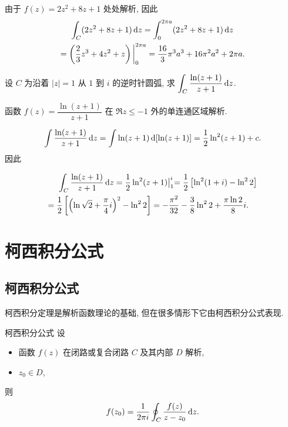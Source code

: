 \begin{solution}
	由于 $f(z)=2z^2+8z+1$ 处处解析,
	{因此
		\begin{align*}
		&\peq\int_C(2z^2+8z+1)\diff z=\int_0^{2\pi a}(2z^2+8z+1)\diff z\\
		&{=\left(\frac23z^3+4z^2+z\right)\bigg|_0^{2\pi a}=\frac{16}3\pi^3a^3+16\pi^2a^2+2\pi a.}
		\end{align*}}
\end{solution}

\begin{example}
	设 $C$ 为沿着 $|z|=1$ 从 $1$ 到 $i$ 的逆时针圆弧, 求 $\displaystyle\int_C\frac{\ln(z+1)}{z+1}\,\mathrm{d} z$.
\end{example}

\begin{solution}
	函数 $f(z)=\dfrac{\ln(z+1)}{z+1}$ 在 $\Re z\le -1$ 外的单连通区域解析.

	{
		\[\int\frac{\ln(z+1)}{z+1}\,\mathrm{d} z
		=\int\ln(z+1)\,\mathrm{d}[\ln(z+1)]=\frac{1}{2}\ln^2(z+1)+c.\]因此

		\begin{align*}
		&\peq\int_C\frac{\ln(z+1)}{z+1}\diff z=\half\ln^2(z+1)\big|_1^i
		{=\half\left[\ln^2(1+i)-\ln^22\right]}\\
		&{=\half\left[\left(\ln\sqrt2+\frac\pi4i\right)^2-\ln^22\right]
		=-\frac{\pi^2}{32}-\frac38\ln^22+\frac{\pi\ln2}{8}i.}
		\end{align*}}
\end{solution}

\section{柯西积分公式}

\subsection{柯西积分公式}

柯西积分定理是解析函数理论的基础, 但在很多情形下它由柯西积分公式表现.

\begin{theorem}{柯西积分公式}
	设
	\begin{itemize}
		\item 函数 $f(z)$ 在闭路或复合闭路 $C$ 及其内部 $D$ 解析,
		\item $z_0\in D$,
	\end{itemize}
	则
		\[f(z_0)=\frac1{2\pi i}\oint_C\frac{f(z)}{z-z_0}\,\mathrm{d} z.\]
\end{theorem}


